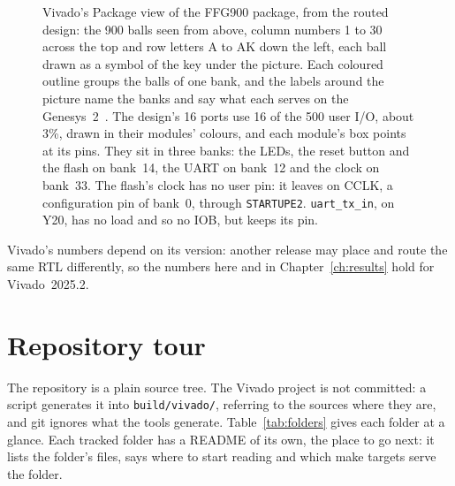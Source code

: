 \documentclass[11pt,a4paper]{report}
\begin{document}
\begin{figure}[H]
  \caption{Vivado's Package view of the FFG900 package, from the routed design: the 900 balls
    seen from above, column numbers 1 to 30 across the top and row letters A to AK down the
    left, each ball drawn as a symbol of the key under the picture. Each coloured outline groups
    the balls of one bank, and the labels around the picture name the banks and say what each
    serves on the Genesys~2~\cite{digilent-genesys2-sch}. The design's 16 ports use 16 of the
    500 user I/O, about 3\%, drawn in their modules' colours, and each module's box points at
    its pins. They sit in three banks: the LEDs, the reset button and the flash on bank~14, the
    UART on bank~12 and the clock on bank~33. The flash's clock has no user pin: it leaves on
    CCLK, a configuration pin of bank~0, through \texttt{STARTUPE2}. \texttt{uart\_tx\_in},
    on Y20, has no load and so no IOB, but keeps its pin.}
  \label{fig:io-package}
\end{figure}

Vivado's numbers depend on its version: another release may place and route the same RTL
differently, so the numbers here and in Chapter~\ref{ch:results} hold for Vivado~2025.2.

\chapter{Repository tour}
\label{ch:repo}

The repository is a plain source tree. The Vivado project is not committed: a script
generates it into \texttt{build/vivado/}, referring to the sources where they are, and git
ignores what the tools generate. Table~\ref{tab:folders} gives each folder at a glance. Each
tracked folder has a README of its own, the place to go next: it lists the folder's files,
says where to start reading and which make targets serve the folder.
\end{document}

